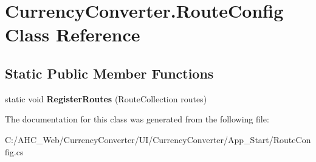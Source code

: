 \hypertarget{class_currency_converter_1_1_route_config}{\section{Currency\-Converter.\-Route\-Config Class Reference}
\label{class_currency_converter_1_1_route_config}
}
\subsection*{Static Public Member Functions}
\begin{DoxyCompactItemize}
\item 
\hypertarget{class_currency_converter_1_1_route_config_af4a2f0bc791312ac744e3b458beac086}{static void {\bfseries Register\-Routes} (Route\-Collection routes)}\label{class_currency_converter_1_1_route_config_af4a2f0bc791312ac744e3b458beac086}

\end{DoxyCompactItemize}


The documentation for this class was generated from the following file\-:\begin{DoxyCompactItemize}
\item 
C\-:/\-A\-H\-C\-\_\-\-Web/\-Currency\-Converter/\-U\-I/\-Currency\-Converter/\-App\-\_\-\-Start/Route\-Config.\-cs\end{DoxyCompactItemize}
